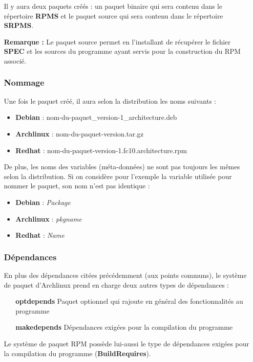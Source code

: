 \documentclass[12pt,a4paper]{article}
\newenvironment{remarque}{\textbf{Remarque :}}{}
\begin{document}
Il y aura deux paquets créés : un paquet binaire qui sera contenu dans le répertoire \textbf{RPMS} et le paquet source qui sera contenu dans le répertoire \textbf{SRPMS}.

\begin{remarque} Le paquet source permet en l'installant de récupérer le fichier \textbf{SPEC} et les sources du programme ayant servis pour la construction du RPM associé.\end{remarque}
\subsubsection{Nommage}
Une fois le paquet créé, il aura selon la distribution les noms suivants :
\begin{itemize}
	\item \textbf{Debian} : nom-du-paquet\_version-1\_architecture.deb
	\item \textbf{Archlinux} : nom-du-paquet-version.tar.gz
	\item \textbf{Redhat} : nom-du-paquet-version-1.fc10.architecture.rpm
\end{itemize}

De plus, les noms des variables (méta-données) ne sont pas toujours les mêmes selon la distribution. Si on considère pour l'exemple la variable utilisée pour nommer le paquet, son nom n'est pas identique :
\begin{itemize}
	\item \textbf{Debian} : \textit{Package}
	\item \textbf{Archlinux} : \textit{pkgname}
	\item \textbf{Redhat} : \textit{Name}
\end{itemize}
\subsubsection{Dépendances}
En plus des dépendances citées précédemment (aux points communs), le système de paquet d'Archlinux prend en charge deux autres types de dépendances :
\begin{itemize}
	\item[\textbf{optdepends}]Paquet optionnel qui rajoute en général des fonctionnalités au programme
	\item[\textbf{makedepends}]Dépendances exigées pour la compilation du programme
\end{itemize}
Le système de paquet RPM possède lui-aussi le type de dépendances exigées pour la compilation du programme (\textbf{BuildRequires}).
\end{document}
